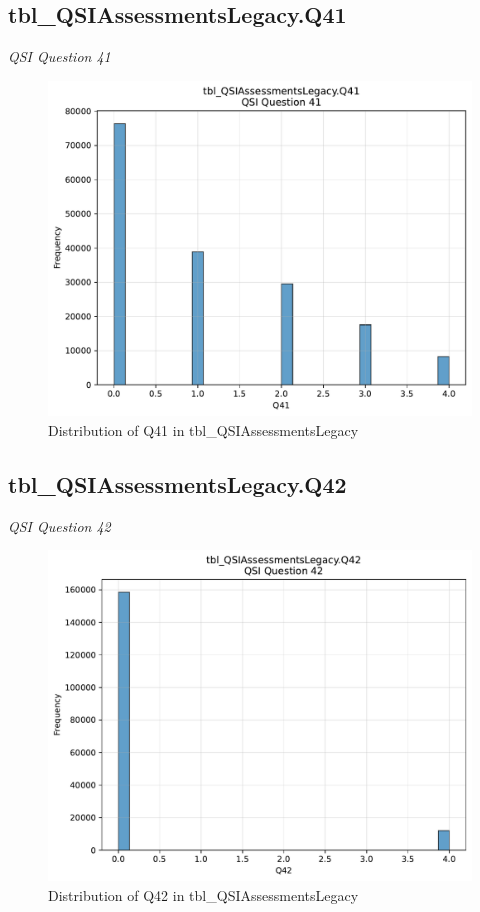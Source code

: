 \subsection{tbl\_QSIAssessmentsLegacy.Q41}
\textit{QSI Question 41}

\begin{figure}[htbp]
\centering
\includegraphics[width=\textwidth]{figures/dbo_tbl_QSIAssessmentsLegacy_Q41.pdf}
\caption{Distribution of Q41 in tbl\_QSIAssessmentsLegacy}
\end{figure}\newpage

\subsection{tbl\_QSIAssessmentsLegacy.Q42}
\textit{QSI Question 42}

\begin{figure}[htbp]
\centering
\includegraphics[width=\textwidth]{figures/dbo_tbl_QSIAssessmentsLegacy_Q42.pdf}
\caption{Distribution of Q42 in tbl\_QSIAssessmentsLegacy}
\end{figure}\newpage

